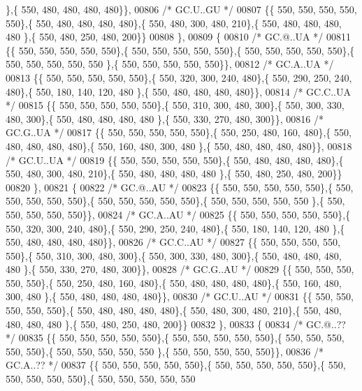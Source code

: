 \begin{DoxyCode}
      \},\{ 550, 480, 480, 480, 480\}\},
00806 \textcolor{comment}{/* GC.U..GU */}
00807 \{\{ 550, 550, 550, 550, 550\},\{ 550, 480, 480, 480, 480\},\{ 550, 480, 300, 480, 210\},\{ 550, 480, 480, 480, 480
      \},\{ 550, 480, 250, 480, 200\}\}
00808 \},
00809 \{
00810 \textcolor{comment}{/* GC.@..UA */}
00811 \{\{ 550, 550, 550, 550, 550\},\{ 550, 550, 550, 550, 550\},\{ 550, 550, 550, 550, 550\},\{ 550, 550, 550, 550, 550
      \},\{ 550, 550, 550, 550, 550\}\},
00812 \textcolor{comment}{/* GC.A..UA */}
00813 \{\{ 550, 550, 550, 550, 550\},\{ 550, 320, 300, 240, 480\},\{ 550, 290, 250, 240, 480\},\{ 550, 180, 140, 120, 480
      \},\{ 550, 480, 480, 480, 480\}\},
00814 \textcolor{comment}{/* GC.C..UA */}
00815 \{\{ 550, 550, 550, 550, 550\},\{ 550, 310, 300, 480, 300\},\{ 550, 300, 330, 480, 300\},\{ 550, 480, 480, 480, 480
      \},\{ 550, 330, 270, 480, 300\}\},
00816 \textcolor{comment}{/* GC.G..UA */}
00817 \{\{ 550, 550, 550, 550, 550\},\{ 550, 250, 480, 160, 480\},\{ 550, 480, 480, 480, 480\},\{ 550, 160, 480, 300, 480
      \},\{ 550, 480, 480, 480, 480\}\},
00818 \textcolor{comment}{/* GC.U..UA */}
00819 \{\{ 550, 550, 550, 550, 550\},\{ 550, 480, 480, 480, 480\},\{ 550, 480, 300, 480, 210\},\{ 550, 480, 480, 480, 480
      \},\{ 550, 480, 250, 480, 200\}\}
00820 \},
00821 \{
00822 \textcolor{comment}{/* GC.@..AU */}
00823 \{\{ 550, 550, 550, 550, 550\},\{ 550, 550, 550, 550, 550\},\{ 550, 550, 550, 550, 550\},\{ 550, 550, 550, 550, 550
      \},\{ 550, 550, 550, 550, 550\}\},
00824 \textcolor{comment}{/* GC.A..AU */}
00825 \{\{ 550, 550, 550, 550, 550\},\{ 550, 320, 300, 240, 480\},\{ 550, 290, 250, 240, 480\},\{ 550, 180, 140, 120, 480
      \},\{ 550, 480, 480, 480, 480\}\},
00826 \textcolor{comment}{/* GC.C..AU */}
00827 \{\{ 550, 550, 550, 550, 550\},\{ 550, 310, 300, 480, 300\},\{ 550, 300, 330, 480, 300\},\{ 550, 480, 480, 480, 480
      \},\{ 550, 330, 270, 480, 300\}\},
00828 \textcolor{comment}{/* GC.G..AU */}
00829 \{\{ 550, 550, 550, 550, 550\},\{ 550, 250, 480, 160, 480\},\{ 550, 480, 480, 480, 480\},\{ 550, 160, 480, 300, 480
      \},\{ 550, 480, 480, 480, 480\}\},
00830 \textcolor{comment}{/* GC.U..AU */}
00831 \{\{ 550, 550, 550, 550, 550\},\{ 550, 480, 480, 480, 480\},\{ 550, 480, 300, 480, 210\},\{ 550, 480, 480, 480, 480
      \},\{ 550, 480, 250, 480, 200\}\}
00832 \},
00833 \{
00834 \textcolor{comment}{/* GC.@..?? */}
00835 \{\{ 550, 550, 550, 550, 550\},\{ 550, 550, 550, 550, 550\},\{ 550, 550, 550, 550, 550\},\{ 550, 550, 550, 550, 550
      \},\{ 550, 550, 550, 550, 550\}\},
00836 \textcolor{comment}{/* GC.A..?? */}
00837 \{\{ 550, 550, 550, 550, 550\},\{ 550, 550, 550, 550, 550\},\{ 550, 550, 550, 550, 550\},\{ 550, 550, 550, 550, 550

\end{DoxyCode}
